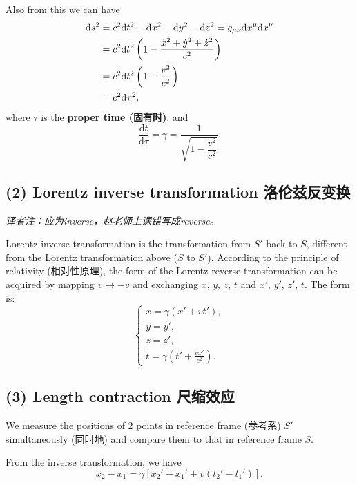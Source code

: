 Also from this we can have \begin{align*}
    \mathrm{d} s^2 & = c^2 \mathrm{d}t^2 - \mathrm{d} x^2 - \mathrm{d} y^2 - \mathrm{d} z^2 = g_{\mu\nu} \mathrm{d}x^{\mu} \mathrm{d}x^{\nu} \\
    & = c^2 \mathrm{d}t^2 \left( 1 - \frac{\dot{x}^2 + \dot{y}^2 + \dot{z}^2}{c^2} \right) \\
    & = c^2 \mathrm{d}t^2 \left( 1 - {v^2 \over c^2} \right) \\
    & = c^2 \mathrm{d} \tau^2,
\end{align*} where \(\tau\) is the \textbf{proper time (固有时)}, and
\[\frac{\mathrm{d}t}{\mathrm{d} \tau} = \gamma = \frac{1}{\sqrt{1 - \dfrac{v^2}{c^2}}}.\]

\subsection*{(2) Lorentz inverse transformation
洛伦兹反变换}\label{lorentz-inverse-transformation-ux6d1bux4f26ux5179ux53cdux53d8ux6362}

\emph{译者注：应为inverse，赵老师上课错写成reverse。}

Lorentz inverse transformation is the transformation from \(S'\) back to
\(S\), different from the Lorentz transformation above (\(S\) to
\(S'\)). According to the principle of relativity (相对性原理), the form
of the Lorentz reverse transformation can be acquired by mapping
\(v \mapsto -v\) and exchanging \(x\), \(y\), \(z\), \(t\) and \(x'\),
\(y'\), \(z'\), \(t\). The form is: \[\left\{
    \begin{array}{l}
        \displaystyle x = \gamma \left( x' + vt' \right), \\
        \displaystyle y = y', \\
        \displaystyle z = z', \\
        \displaystyle t = \gamma \left( t' + \frac{vx'}{c^2} \right).
    \end{array}
\right.\]

\subsection*{(3) Length contraction
尺缩效应}\label{length-contraction-ux5c3aux7f29ux6548ux5e94}

We measure the positions of 2 points in reference frame (参考系) \(S'\)
simultaneously (同时地) and compare them to that in reference frame
\(S\).

From the inverse transformation, we have
\[x_2 - x_1 = \gamma \left[ x_2' - x_1' + v(t_2' - t_1') \right].\]

